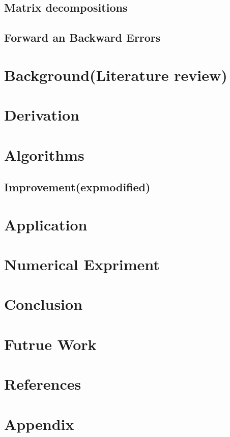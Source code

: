 \documentclass[11pt]{article}
\begin{document}
\subsection{Matrix decompositions}

\subsection{Forward an Backward Errors}


\section{Background(Literature review)}

\section{Derivation}


\section{Algorithms}


\subsection{Improvement(expmodified)}

\section{Application}


\section{Numerical Expriment}


\section{Conclusion}

\section{Futrue Work}

\section*{References}

\section*{Appendix}
\end{document}
